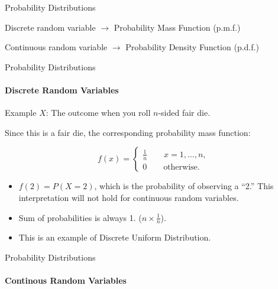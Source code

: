 \documentclass{beamer}\usepackage[]{graphicx}\usepackage[]{color}
\begin{document}
\begin{darkframes}
\begin{frame}[label=lists]{Probability Distributions}
\begin{definition}
       		Discrete random variable $\rightarrow$ Probability Mass Function (p.m.f.) \pause
       		
       		Continuous random variable $\rightarrow$ Probability Density Function (p.d.f.)

      	\end{definition}
    
    
		
  
	\end{frame}  	
	  
  
  




	\begin{frame}[label=lists]{Probability Distributions}
		\framesubtitle{Discrete Random Variables} 
	
		\begin{exampleblock}{Example}
			$X$: The outcome when you roll $n$-sided fair die. \pause
			
			Since this is a fair die, the corresponding probability mass function:
			
			$$ f(x) = 
			\begin{cases}
				\frac{1}{n} \qquad x= 1,\ldots,n, \\
				0 \qquad   \text{otherwise.}
			\end{cases}
			$$
        \end{exampleblock} \pause
        
       
        \begin{itemize}
        	\item $f(2)=P(X=2)$, which is the probability of observing a ``2.'' This interpretation will not hold for continuous random variables. \pause
        	
        	\item Sum of probabilities is always 1. ($n \times \frac{1}{n}$).  \pause
    		
    		\item This is an example of \alert{Discrete Uniform Distribution}.    	
	        	
        \end{itemize} 
	\end{frame}







	\begin{frame}[label=lists]{Probability Distributions}
		\framesubtitle{Continous Random Variables} 
	

\end{frame}
\end{darkframes}
\end{document}
